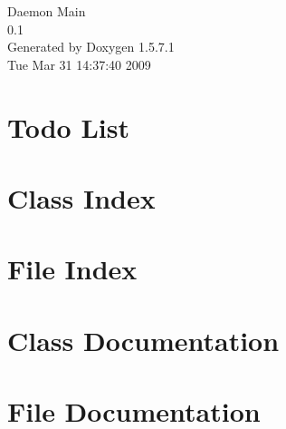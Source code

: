 \documentclass[a4paper]{book}
\begin{document}
\begin{titlepage}
\vspace*{7cm}
\begin{center}
{\Large Daemon Main \\[1ex]\large 0.1 }\\
\vspace*{1cm}
{\large Generated by Doxygen 1.5.7.1}\\
\vspace*{0.5cm}
{\small Tue Mar 31 14:37:40 2009}\\
\end{center}
\end{titlepage}
\clearemptydoublepage
{}
\tableofcontents
\clearemptydoublepage
{}
\chapter{Todo List}
\label{todo}

\chapter{Class Index}

\chapter{File Index}

\chapter{Class Documentation}












\chapter{File Documentation}





























\printindex
\end{document}
